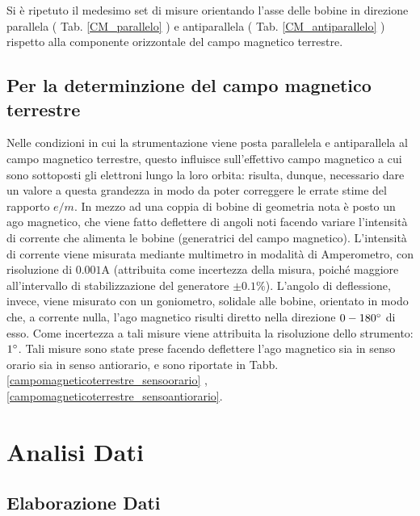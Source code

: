 \documentclass[]{article}
\let\oldsection\section%
\renewcommand{\section}{%
	\renewcommand{\theequation}{\thesection.\arabic{equation}}%
	\oldsection}%
\let\oldsubsection\subsection%
\renewcommand{\subsection}{%
	\renewcommand{\theequation}{\thesubsection.\arabic{equation}}%
	\oldsubsection}%
\begin{document}
    Si è ripetuto il medesimo set di misure orientando l'asse delle bobine in direzione parallela ( Tab. \ref{CM_parallelo} ) e antiparallela ( Tab. \ref{CM_antiparallelo} ) rispetto alla componente orizzontale del campo magnetico terrestre.

    \subsection{Per la determinzione del campo magnetico terrestre}
    Nelle condizioni in cui la strumentazione viene posta parallelela e antiparallela al campo magnetico terrestre, questo influisce sull'effettivo campo magnetico a cui sono sottoposti gli elettroni lungo la loro orbita: risulta, dunque, necessario dare un valore a questa grandezza in modo da poter correggere le errate stime del rapporto $e/m$. In mezzo ad una coppia di bobine di geometria nota è posto un ago magnetico, che viene fatto deflettere di angoli noti facendo variare l'intensità di corrente che alimenta le bobine (generatrici del campo magnetico). L'intensità di corrente viene misurata mediante multimetro in modalità di Amperometro, con risoluzione di $0.001 \text{A}$ (attribuita come incertezza della misura, poiché maggiore all'intervallo di stabilizzazione del generatore $\pm 0.1 \%$). L'angolo di deflessione, invece, viene misurato con un goniometro, solidale alle bobine, orientato in modo che, a corrente nulla, l'ago magnetico risulti diretto nella direzione $0-180 \degree $ di esso. Come incertezza a tali misure viene attribuita la risoluzione dello strumento: $1 \degree$. Tali misure sono state prese facendo deflettere l'ago magnetico sia in senso orario sia in senso antiorario, e sono riportate in Tabb. \ref{campomagneticoterrestre_sensoorario} , \ref{campomagneticoterrestre_sensoantiorario}.
    

    \section {Analisi Dati}

    \subsection{Elaborazione Dati}
\end{document}
